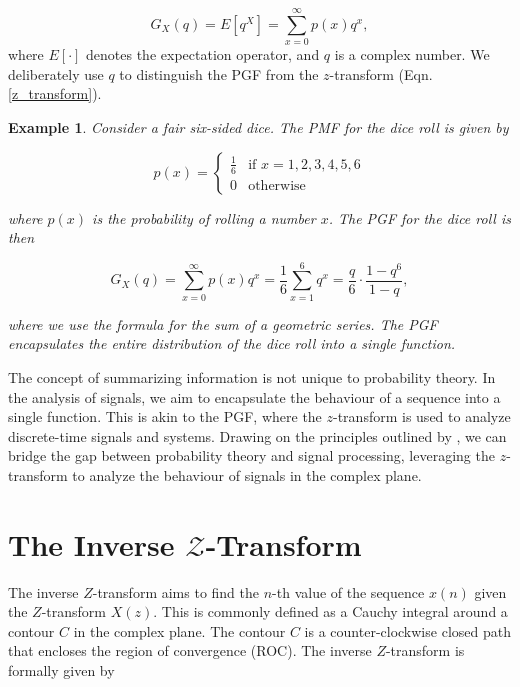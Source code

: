 \documentclass[a4paper]{report}
\newtheorem{example}{Example}
\begin{document}
\begin{equation}
	G_X(q) = E[q^X] = \sum^{\infty}_{x = 0} p(x)q^x,
\end{equation}
where $E[\cdot]$ denotes the expectation operator, and $q$ is a complex number. We deliberately use $q$ to distinguish the PGF from the $z$-transform (Eqn. \ref{z_transform}).

\begin{example}
    Consider a fair six-sided dice. The PMF for the dice roll is given by
    
    \begin{equation}
        p(x) = \begin{cases}
            \frac{1}{6} & \text{if } x = 1, 2, 3, 4, 5, 6 \\
            0 & \text{otherwise}
        \end{cases}
    \end{equation}

    where $p(x)$ is the probability of rolling a number $x$. The PGF for the dice roll is then

    \begin{equation}
        G_X(q) = \sum^{\infty}_{x = 0} p(x)q^x = \frac{1}{6} \sum^6_{x = 1} q^x = \frac{q}{6}\cdot \frac{1-q^6}{1-q},
    \end{equation}

    where we use the formula for the sum of a geometric series. The PGF encapsulates the entire distribution of the dice roll into a single function.
\end{example}

The concept of summarizing information is not unique to probability theory. In the analysis of signals, we aim to encapsulate the behaviour of a sequence into a single function. This is akin to the PGF, where the $z$-transform is used to analyze discrete-time signals and systems. Drawing on the principles outlined by \citet{ross2014introduction}, we can bridge the gap between probability theory and signal processing, leveraging the $z$-transform to analyze the behaviour of signals in the complex plane.

\section{The Inverse \texorpdfstring{$\mathcal{Z}$}{Lg}-Transform}

The inverse $Z$-transform aims to find the $n$-th value of the sequence $x(n)$ given the $Z$-transform $X(z)$. This is commonly defined as a Cauchy integral around a contour $C$ in the complex plane. The contour $C$ is a counter-clockwise closed path that encloses the region of convergence (ROC). The inverse $Z$-transform is formally given by
\end{document}

